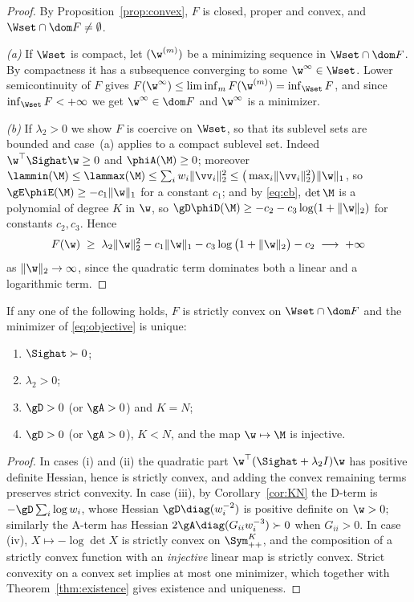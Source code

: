 \begin{proof}
By Proposition~\ref{prop:convex}, $F$ is closed, proper and convex, and
$\Wset\cap\dom F\neq\emptyset$.

\emph{(a)} If $\Wset$ is compact, let $(\w^{(m)})$ be a minimizing sequence in
$\Wset\cap\dom F$. By compactness it has a subsequence converging to some
$\w^{\infty}\in\Wset$. Lower semicontinuity of $F$ gives
$F(\w^{\infty})\le\liminf_mF(\w^{(m)})=\inf_{\Wset}F$, and since
$\inf_{\Wset}F<+\infty$ we get $\w^{\infty}\in\dom F$ and $\w^{\infty}$ is a
minimizer.

\emph{(b)} If $\lambda_2>0$ we show $F$ is coercive on $\Wset$, so that its
sublevel sets are bounded and case~(a) applies to a compact sublevel set. Indeed
$\w^\top\Sighat\w\ge0$ and $\phiA(\M)\ge0$; moreover
$\lammin(\M)\le\lammax(\M)\le\sum_iw_i\lVert\vv_i\rVert_2^2
\le\big(\max_i\lVert\vv_i\rVert_2^2\big)\lVert\w\rVert_1$, so
$\gE\phiE(\M)\ge-c_1\lVert\w\rVert_1$ for a constant $c_1$; and by
\eqref{eq:cb}, $\det\M$ is a polynomial of degree $K$ in $\w$, so
$\gD\phiD(\M)\ge-c_2-c_3\log(1+\lVert\w\rVert_2)$ for constants $c_2,c_3$. Hence
\[
  F(\w)\;\ge\;\lambda_2\lVert\w\rVert_2^2-c_1\lVert\w\rVert_1
  -c_3\log\big(1+\lVert\w\rVert_2\big)-c_2\;\longrightarrow\;+\infty
\]
as $\lVert\w\rVert_2\to\infty$, since the quadratic term dominates both a linear
and a logarithmic term.
\end{proof}

\begin{theorem}[Uniqueness]
\label{thm:uniqueness}
If any one of the following holds, $F$ is strictly convex on $\Wset\cap\dom F$ and
the minimizer of \eqref{eq:objective} is unique:
\begin{enumerate}[label=(\roman*),leftmargin=2.0em,itemsep=0.15em]
  \item $\Sighat\succ0$;
  \item $\lambda_2>0$;
  \item $\gD>0$ (or $\gA>0$) and $K=N$;
  \item $\gD>0$ (or $\gA>0$), $K<N$, and the map $\w\mapsto\M$ is injective.
\end{enumerate}
\end{theorem}

\begin{proof}
In cases (i) and (ii) the quadratic part $\w^\top(\Sighat+\lambda_2I)\w$ has
positive definite Hessian, hence is strictly convex, and adding the convex
remaining terms preserves strict convexity. In case (iii), by
Corollary~\ref{cor:KN} the D-term is $-\gD\sum_i\log w_i$, whose Hessian
$\gD\diag(w_i^{-2})$ is positive definite on $\w>0$; similarly the A-term has
Hessian $2\gA\diag(G_{ii}w_i^{-3})\succ0$ when $G_{ii}>0$. In case (iv),
$X\mapsto-\log\det X$ is strictly convex on $\Sym^{K}_{++}$, and the composition
of a strictly convex function with an \emph{injective} linear map is strictly
convex. Strict convexity on a convex set implies at most one minimizer, which
together with Theorem~\ref{thm:existence} gives existence and uniqueness.
\end{proof}


